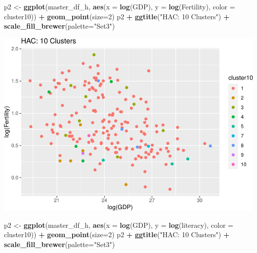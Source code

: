 \documentclass[]{article}
\newenvironment{Shaded}{\begin{snugshade}}{\end{snugshade}}
\newcommand{\DataTypeTok}[1]{\textcolor[rgb]{0.13,0.29,0.53}{#1}}
\newcommand{\DecValTok}[1]{\textcolor[rgb]{0.00,0.00,0.81}{#1}}
\newcommand{\KeywordTok}[1]{\textcolor[rgb]{0.13,0.29,0.53}{\textbf{#1}}}
\newcommand{\NormalTok}[1]{#1}
\newcommand{\OperatorTok}[1]{\textcolor[rgb]{0.81,0.36,0.00}{\textbf{#1}}}
\newcommand{\StringTok}[1]{\textcolor[rgb]{0.31,0.60,0.02}{#1}}
\begin{document}
\begin{Shaded}
\begin{Highlighting}[]
\NormalTok{p2 <-}\StringTok{ }\KeywordTok{ggplot}\NormalTok{(master_df_h, }\KeywordTok{aes}\NormalTok{(}\DataTypeTok{x =} \KeywordTok{log}\NormalTok{(GDP), }\DataTypeTok{y =} \KeywordTok{log}\NormalTok{(Fertility), }\DataTypeTok{color =}\NormalTok{ cluster10)) }\OperatorTok{+}
\StringTok{  }\KeywordTok{geom_point}\NormalTok{(}\DataTypeTok{size=}\DecValTok{2}\NormalTok{)}
\NormalTok{p2 }\OperatorTok{+}\StringTok{ }\KeywordTok{ggtitle}\NormalTok{(}\StringTok{"HAC: 10 Clusters"}\NormalTok{) }\OperatorTok{+}\StringTok{ }\KeywordTok{scale_fill_brewer}\NormalTok{(}\DataTypeTok{palette=}\StringTok{"Set3"}\NormalTok{)}
\end{Highlighting}
\end{Shaded}

\includegraphics{eda_files/figure-latex/unnamed-chunk-31-3.pdf}

\begin{Shaded}
\begin{Highlighting}[]
\NormalTok{p2 <-}\StringTok{ }\KeywordTok{ggplot}\NormalTok{(master_df_h, }\KeywordTok{aes}\NormalTok{(}\DataTypeTok{x =} \KeywordTok{log}\NormalTok{(GDP), }\DataTypeTok{y =} \KeywordTok{log}\NormalTok{(literacy), }\DataTypeTok{color =}\NormalTok{ cluster10)) }\OperatorTok{+}
\StringTok{  }\KeywordTok{geom_point}\NormalTok{(}\DataTypeTok{size=}\DecValTok{2}\NormalTok{)}
\NormalTok{p2 }\OperatorTok{+}\StringTok{ }\KeywordTok{ggtitle}\NormalTok{(}\StringTok{"HAC: 10 Clusters"}\NormalTok{) }\OperatorTok{+}\StringTok{ }\KeywordTok{scale_fill_brewer}\NormalTok{(}\DataTypeTok{palette=}\StringTok{"Set3"}\NormalTok{)}
\end{Highlighting}
\end{Shaded}
\end{document}
